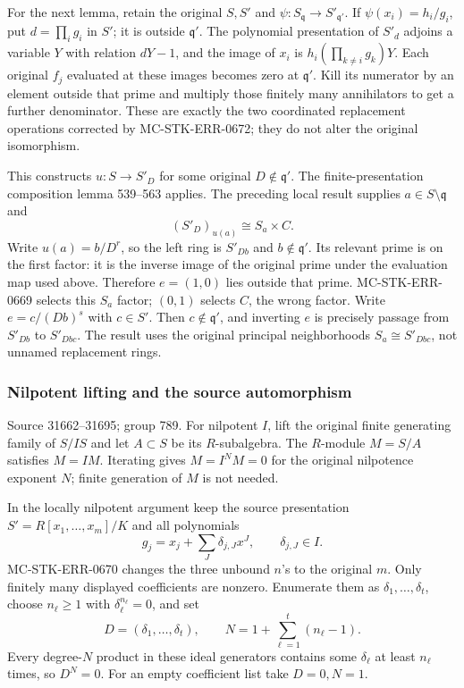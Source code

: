 For the next lemma, retain the original \(S,S'\) and \(\psi:S_{\mathfrak q}\to S'_{\mathfrak q'}\). If \(\psi(x_i)=h_i/g_i\), put \(d=\prod_i g_i\) in \(S'\); it is outside \(\mathfrak q'\). The polynomial presentation of \(S'_d\) adjoins a variable \(Y\) with relation \(dY-1\), and the image of \(x_i\) is \(h_i(\prod_{k\ne i}g_k)Y\). Each original \(f_j\) evaluated at these images becomes zero at \(\mathfrak q'\). Kill its numerator by an element outside that prime and multiply those finitely many annihilators to get a further denominator. These are exactly the two coordinated replacement operations corrected by MC-STK-ERR-0672; they do not alter the original isomorphism.

This constructs \(u:S\to S'_D\) for some original \(D\notin\mathfrak q'\). The finite-presentation composition lemma 539--563 applies. The preceding local result supplies \(a\in S\setminus\mathfrak q\) and \[
(S'_D)_{u(a)}\cong S_a\times C.
\] Write \(u(a)=b/D^r\), so the left ring is \(S'_{Db}\) and \(b\notin\mathfrak q'\). Its relevant prime is on the first factor: it is the inverse image of the original prime under the evaluation map used above. Therefore \(e=(1,0)\) lies outside that prime. MC-STK-ERR-0669 selects this \(S_a\) factor; \((0,1)\) selects \(C\), the wrong factor. Write \(e=c/(Db)^s\) with \(c\in S'\). Then \(c\notin\mathfrak q'\), and inverting \(e\) is precisely passage from \(S'_{Db}\) to \(S'_{Dbc}\). The result uses the original principal neighborhoods \(S_a\cong S'_{Dbc}\), not unnamed replacement rings.

\subsubsection{Nilpotent lifting and the source automorphism}\label{algebra-proof-035-nilpotent-lifting-and-the-source-automorphism}

Source 31662--31695; group 789. For nilpotent \(I\), lift the original finite generating family of \(S/IS\) and let \(A\subset S\) be its \(R\)-subalgebra. The \(R\)-module \(M=S/A\) satisfies \(M=IM\). Iterating gives \(M=I^NM=0\) for the original nilpotence exponent \(N\); finite generation of \(M\) is not needed.

In the locally nilpotent argument keep the source presentation \(S'=R[x_1,\ldots,x_m]/K\) and all polynomials \[
g_j=x_j+\sum_J\delta_{j,J}x^J,\qquad \delta_{j,J}\in I.
\] MC-STK-ERR-0670 changes the three unbound \(n\)'s to the original \(m\). Only finitely many displayed coefficients are nonzero. Enumerate them as \(\delta_1,\ldots,\delta_t\), choose \(n_\ell\ge1\) with \(\delta_\ell^{n_\ell}=0\), and set \[
D=(\delta_1,\ldots,\delta_t),\qquad N=1+\sum_{\ell=1}^t(n_\ell-1).
\] Every degree-\(N\) product in these ideal generators contains some \(\delta_\ell\) at least \(n_\ell\) times, so \(D^N=0\). For an empty coefficient list take \(D=0,N=1\).

